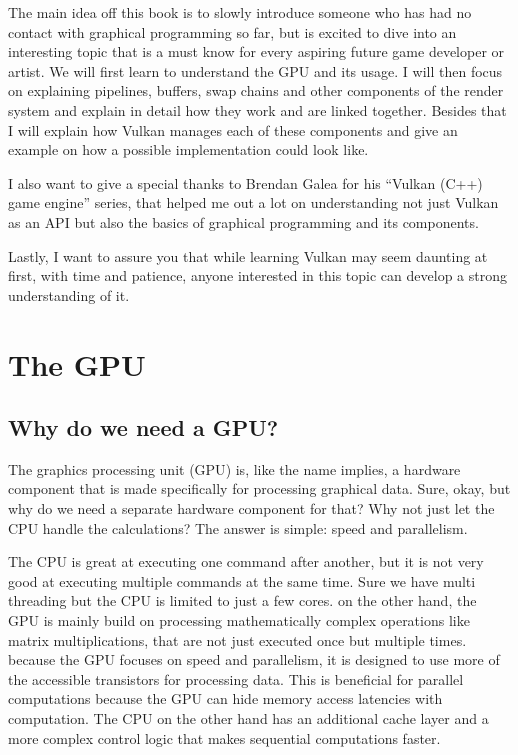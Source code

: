 \documentclass[12pt]{report} \usepackage{preamble}
\begin{document}
The main idea off this book is to slowly introduce someone who has had
no contact with graphical programming so far, but is excited to dive
into an interesting topic that is a must know for every aspiring future
game developer or artist. We will first learn to understand the \ac{GPU} and
its usage. I will then focus on explaining pipelines, buffers, swap chains
and other components of the render system and explain in detail how they work
and are linked together. Besides that I will explain how Vulkan manages
each of these components and give an example on how a possible implementation
could look like.

I also want to give a special thanks to Brendan Galea for his “Vulkan
(C++) game engine” series, that helped me out a lot on understanding
not just Vulkan as an \ac{API} but also the basics of graphical programming
and its components.

Lastly, I want to assure you that while learning Vulkan may seem daunting
at first, with time and patience, anyone interested in this topic can
develop a strong understanding of it.

\chapter{The GPU}

\section{Why do we need a GPU?}

The graphics processing unit (\ac{GPU}) is, like the name implies, a hardware
component that is made specifically for processing graphical data. Sure,
okay, but why do we need a separate hardware component for that?  Why not
just let the \ac{CPU} handle the calculations? The answer is simple: speed
and parallelism.

The \ac{CPU} is great at executing one command after another, but
it is not very good at executing multiple commands at the same
time. Sure we have multi threading but the \ac{CPU} is limited to just a
few cores. \cite{CDW-cpu_vs_gpu} on the other hand, the \ac{GPU} is mainly
build on processing mathematically complex operations like matrix
multiplications, that are not just executed once but multiple
times. \cite{NVIDIA-cpu-gpu} because the \ac{GPU} focuses on speed
and parallelism, it is designed to use more of the accessible
transistors for processing data. This is beneficial for parallel
computations because the \ac{GPU} can hide memory access latencies with
computation. The \ac{CPU} on the other hand has an additional cache layer
and a more complex control logic that makes sequential computations
faster. \cite{CUDA_Programming_Guide}
\end{document}
